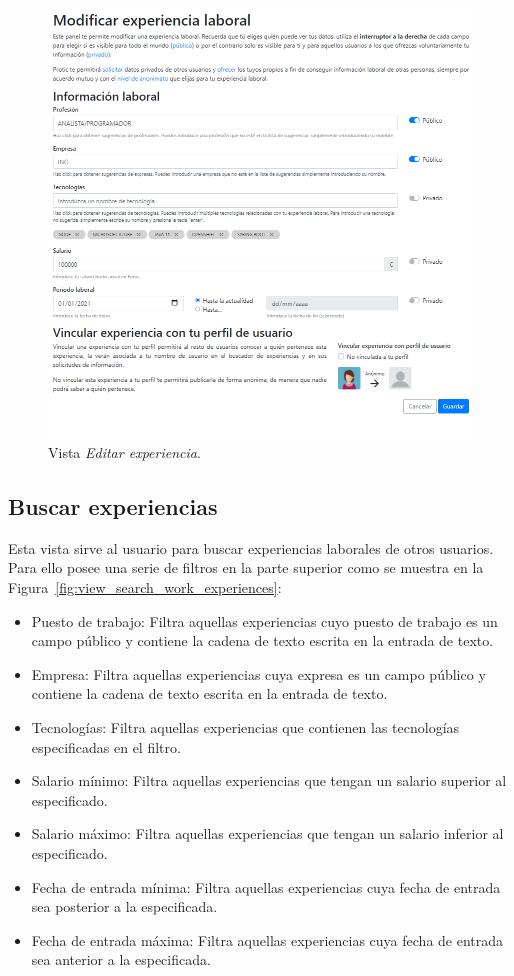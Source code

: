 \documentclass[a4paper, 12pt]{book}
\begin{document}
    \begin{figure}
        \centering
        \includegraphics[width=15cm, keepaspectratio]{img/edit_we.PNG}
        \caption{Vista \emph{Editar experiencia}.}\label{fig:view_edit_work_experience}
    \end{figure}

    \subsection{Buscar experiencias}
    \label{subsec:view_search_work_experiences}
    Esta vista sirve al usuario para buscar experiencias laborales de otros usuarios.
    Para ello posee una serie de filtros en la parte superior como se muestra en la Figura~\ref{fig:view_search_work_experiences}:

    \begin{itemize}
        \item Puesto de trabajo: Filtra aquellas experiencias cuyo puesto de trabajo es un campo público y contiene la cadena de texto escrita en la entrada de texto.
        \item Empresa: Filtra aquellas experiencias cuya expresa es un campo público y contiene la cadena de texto escrita en la entrada de texto.
        \item Tecnologías: Filtra aquellas experiencias que contienen las tecnologías especificadas en el filtro.
        \item Salario mínimo: Filtra aquellas experiencias que tengan un salario superior al especificado.
        \item Salario máximo: Filtra aquellas experiencias que tengan un salario inferior al especificado.
        \item Fecha de entrada mínima: Filtra aquellas experiencias cuya fecha de entrada sea posterior a la especificada.
        \item Fecha de entrada máxima: Filtra aquellas experiencias cuya fecha de entrada sea anterior a la especificada.
    \end{itemize}
\end{document}
